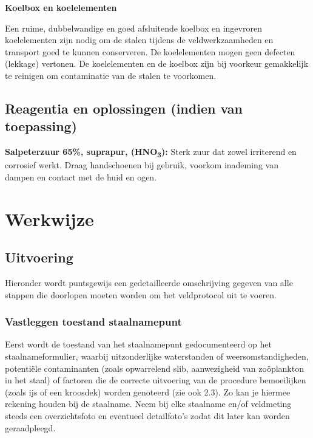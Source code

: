 \documentclass[
]{scrreprt}
\begin{document}
\textbf{Koelbox en koelelementen}

Een ruime, dubbelwandige en goed afsluitende koelbox en ingevroren koelelementen zijn nodig om de stalen tijdens de veldwerkzaamheden en transport goed te kunnen conserveren. De koelelementen mogen geen defecten (lekkage) vertonen. De koelelementen en de koelbox zijn bij voorkeur gemakkelijk te reinigen om contaminatie van de stalen te voorkomen.

\section{Reagentia en oplossingen (indien van toepassing)}\label{reagentia-en-oplossingen-indien-van-toepassing}

\textbf{Salpeterzuur 65\%, suprapur, (HNO\textsubscript{3}):} Sterk zuur dat zowel irriterend en corrosief werkt. Draag handschoenen bij gebruik, voorkom inademing van dampen en contact met de huid en ogen.

\chapter{Werkwijze}\label{werkwijze}

\section{Uitvoering}\label{uitvoering}

Hieronder wordt puntsgewijs een gedetailleerde omschrijving gegeven van alle stappen die doorlopen moeten worden om het veldprotocol uit te voeren.

\subsection{\texorpdfstring{\textbf{Vastleggen toestand staalnamepunt}}{Vastleggen toestand staalnamepunt}}\label{vastleggen-toestand-staalnamepunt}

Eerst wordt de toestand van het staalnamepunt gedocumenteerd op het staalnameformulier, waarbij uitzonderlijke waterstanden of weersomstandigheden, potentiële contaminanten (zoals opwarrelend slib, aanwezigheid van zoöplankton in het staal) of factoren die de correcte uitvoering van de procedure bemoeilijken (zoals ijs of een kroosdek) worden genoteerd (zie ook 2.3). Zo kan je hiermee rekening houden bij de staalname. Neem bij elke staalname en/of veldmeting steeds een overzichtsfoto en eventueel detailfoto's zodat dit later kan worden geraadpleegd.
\end{document}
